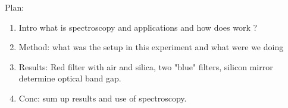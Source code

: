%

Plan:
\begin{enumerate}
    \item{Intro what is spectroscopy and applications and how does work ? }
    \item{Method: what was the setup in this experiment and what were we doing}
    \item{Results: Red filter with air and silica, two "blue" filters, silicon mirror determine optical band gap.}
    \item{Conc: sum up results and use of spectroscopy.}
\end{enumerate}







%